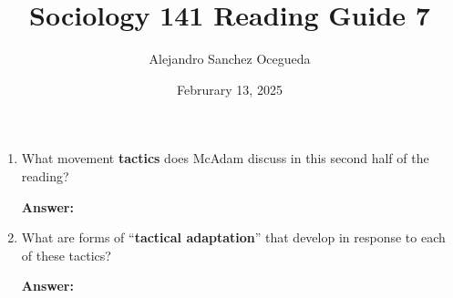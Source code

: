 \documentclass{article}
\title{Sociology 141 Reading Guide 7}
\author{Alejandro Sanchez Ocegueda}
\date{Februrary 13, 2025}
\newcommand{\answer}{\textbf{Answer:}$\;$}
\begin{document}
\maketitle

\begin{enumerate}[label=\arabic*)]
    \item What movement \textbf{tactics} does McAdam discuss in this second half of the reading?
    
    \answer 
    
    \item What are forms of ``\textbf{tactical adaptation}'' that develop in response to each of these tactics?
    
    \answer 
    
        
\end{enumerate}
 
\end{document}
